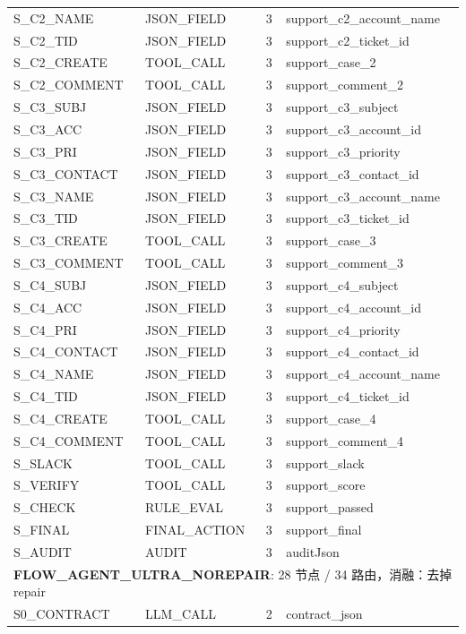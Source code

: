 {\begin{longtable}{p{5.0cm}p{3.1cm}p{1.0cm}p{5.0cm}}
S\_C2\_NAME & JSON\_FIELD & 3 & support\_c2\_account\_name \\
S\_C2\_TID & JSON\_FIELD & 3 & support\_c2\_ticket\_id \\
S\_C2\_CREATE & TOOL\_CALL & 3 & support\_case\_2 \\
S\_C2\_COMMENT & TOOL\_CALL & 3 & support\_comment\_2 \\
S\_C3\_SUBJ & JSON\_FIELD & 3 & support\_c3\_subject \\
S\_C3\_ACC & JSON\_FIELD & 3 & support\_c3\_account\_id \\
S\_C3\_PRI & JSON\_FIELD & 3 & support\_c3\_priority \\
S\_C3\_CONTACT & JSON\_FIELD & 3 & support\_c3\_contact\_id \\
S\_C3\_NAME & JSON\_FIELD & 3 & support\_c3\_account\_name \\
S\_C3\_TID & JSON\_FIELD & 3 & support\_c3\_ticket\_id \\
S\_C3\_CREATE & TOOL\_CALL & 3 & support\_case\_3 \\
S\_C3\_COMMENT & TOOL\_CALL & 3 & support\_comment\_3 \\
S\_C4\_SUBJ & JSON\_FIELD & 3 & support\_c4\_subject \\
S\_C4\_ACC & JSON\_FIELD & 3 & support\_c4\_account\_id \\
S\_C4\_PRI & JSON\_FIELD & 3 & support\_c4\_priority \\
S\_C4\_CONTACT & JSON\_FIELD & 3 & support\_c4\_contact\_id \\
S\_C4\_NAME & JSON\_FIELD & 3 & support\_c4\_account\_name \\
S\_C4\_TID & JSON\_FIELD & 3 & support\_c4\_ticket\_id \\
S\_C4\_CREATE & TOOL\_CALL & 3 & support\_case\_4 \\
S\_C4\_COMMENT & TOOL\_CALL & 3 & support\_comment\_4 \\
S\_SLACK & TOOL\_CALL & 3 & support\_slack \\
S\_VERIFY & TOOL\_CALL & 3 & support\_score \\
S\_CHECK & RULE\_EVAL & 3 & support\_passed \\
S\_FINAL & FINAL\_ACTION & 3 & support\_final \\
S\_AUDIT & AUDIT & 3 & auditJson \\
\midrule
\multicolumn{4}{l}{\textbf{FLOW\_AGENT\_ULTRA\_NOREPAIR}: 28 节点 / 34 路由，消融：去掉 repair} \\
\midrule
S0\_CONTRACT & LLM\_CALL & 2 & contract\_json \\

\end{longtable}}
